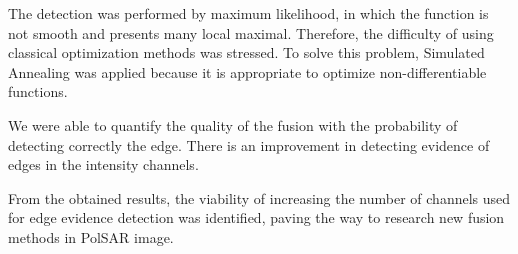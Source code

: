 \documentclass[a4paper,12pt]{article}
\begin{document}
The detection was performed by maximum likelihood, in which the function is not smooth and presents many local maximal.
Therefore, the difficulty of using classical optimization methods was stressed. 
To solve this problem, Simulated Annealing was applied because it is appropriate to optimize non-differentiable functions.

We were able to quantify the quality of the fusion with the probability of detecting correctly the edge. 
There is an improvement in detecting evidence of edges in the intensity channels.

From the obtained results, the viability of increasing the number of channels used for edge evidence detection was identified, paving the way to research new fusion methods in PolSAR image.

	
	
\end{document}
